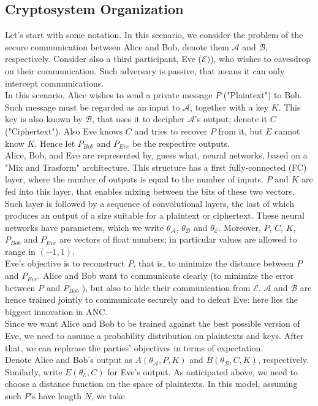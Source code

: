 \documentclass[%
    corpo=11pt,
    twoside,
    stile=classica,
    oldstyle,
    autoretitolo,
    tipotesi=magistrale,
    greek,
    evenboxes,
    english
]{toptesi}
\begin{document}
\subsection{Cryptosystem Organization}
Let's start with some notation. In this scenario, we consider the problem of the secure communication between Alice and Bob, denote them $\mathcal{A}$ and 
$\mathcal{B}$, respectively. Consider also a third participant, Eve ($\mathcal{E})$), who wishes to eavesdrop on their communication. Such adversary is passive, that means it can only intercept communications. \\
In this scenario, Alice wishes to send a private message $P$  ("Plaintext") to Bob. Such message must be regarded as an input to $\mathcal{A}$, together with a key $K$. This key is also known by $\mathcal{B}$, that uses it to decipher $\mathcal{A}$'s output; denote it $C$ ("Ciphertext"). Also Eve knows $C$ and tries to recover $P$ from it, but $E$ cannot know $K$. Hence let $P_{Bob}$ and $P_{Eve}$ be the respective outputs. \\
Alice, Bob, and Eve are represented by, guess what, neural networks, based on a "Mix and Trasform" architecture. This structure has a first fully-connected
(FC) layer, where the number of outputs is equal to the number of inputs. $P$ and $K$ are fed into this layer, that enables mixing between the bits of these two vectors. Such layer is followed by a sequence of convolutional layers, the last of which produces an output of a size suitable for a plaintext or ciphertext.  These neural networks have parameters, which we write $\theta_{\mathcal{A}}$, $\theta_{\mathcal{B}}$ and $\theta_{\mathcal{E}}$. Moreover, $P$, $C$, $K$, $P_{Bob}$ and $P_{Eve}$ are vectors of float numbers; in particular values are allowed to range in $(-1, 1)$. \\
Eve's objective is to reconstruct $P$, that is, to minimize the distance between $P$ and $P_{Eve}$. Alice and Bob want to communicate clearly (to minimize the error between $P$ and $P_{Bob}$ ), but also to hide their communication from $\mathcal{E}$. $\mathcal{A}$ and $\mathcal{B}$ are hence trained jointly to communicate securely and to defeat Eve: here lies the biggest innovation in ANC. \\
Since we want Alice and Bob to be trained against the best possible version of Eve, we need to assume a probability distribution on plaintexts and keys. After that, we can rephrase the parties' objectives in terms of expectation. \\
Denote Alice and Bob's output as $A(\theta_{\mathcal{A}}, P, K)$ and $B(\theta_{\mathcal{B}}, C, K)$, respectively. Similarly, write $E(\theta_{\mathcal{E}}, C)$ for Eve's output. As anticipated above, we need to choose a distance function on the space of plaintexts. In this model, assuming such $P$'s have length $N$, we take
\end{document}
